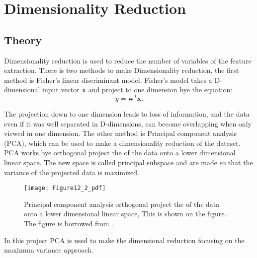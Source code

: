 \chapter{Dimensionality Reduction}
\section{Theory}
Dimensionality reduction is used to reduce the number of variables of the feature extraction.
There is two methods to make Dimensionality reduction, the first method is Fisher's linear discriminant model.
Fisher's model takes a D-dimensional input vector \textbf{x} and project to one dimension bye the equation:
\begin{equation}
y = \mathbf{w}^T \mathbf{x}.
\label{eq:fisher}
\end{equation} 

The projection down to one dimension leads to loss of information, and the data even if it was well separated in D-dimensions, can become overlapping when only viewed in one dimension.
The other method is Principal component analysis (PCA), which can be used to make a dimensionality reduction of the dataset.
PCA works bye orthogonal project the of the data onto a lower dimensional linear space.
The new space is called principal subspace and are made so that the variance of the projected data is maximized. 

\begin{figure}[H]
\centering
\texttt{[image: Figure12\_2\_pdf]}
\caption{Principal component analysis orthogonal project the of the data onto a lower dimensional linear space, This is shown on the figure. The figure is borrowed from \cite{bishop2007}.}
\label{fig:dim_PCA_book}
\end{figure}

In this project PCA is used to make the dimensional reduction focusing on the maximum variance approach.

